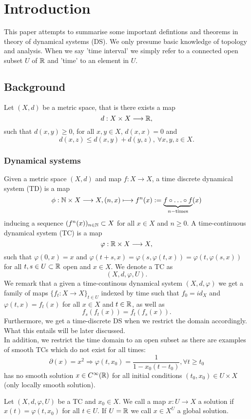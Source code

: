 \section{Introduction}
This paper attempts to summarise some important defintions and theorems in theory of dynamical systems (DS). We only presume basic knowledge of topology and analysis. When we say 'time interval' we simply refer to a connected open subset $U$ of $\mathbb{R}$ and 'time' to an element in $U$.
\subsection{Background}
Let $(X,d)$ be a metric space, that is there exists a map
$$d : X \times X \longrightarrow \mathbb{R},$$
such that $d(x,y) \geq 0$, for all $x, y \in X$, $d(x,x) = 0$ and 
$$d(x,z) \leq d(x,y) + d(y,z),\ \forall x, y, z \in X.$$
\subsubsection{Dynamical systems}
Given a metric space $(X,d)$ and map $f : X \longrightarrow X$, a time discrete dynamical system (TD) is a map
$$\phi : \mathbb{N} \times X \longrightarrow X, (n,x) \longmapsto f^n (x) := \underbrace{f \circ \ldots \circ f}_{n-\mathrm{times}}(x)$$
inducing a sequence $(f^n(x))_{n \in \mathbb{N}} \subset X$ for all $x \in X$ and $n \geq 0$. A time-continuous dynamical system (TC) is a map
$$\varphi : \mathbb{R} \times X \longrightarrow X,$$
such that $\varphi(0,x) = x$ and $\varphi(t + s,x) = \varphi(s,\varphi(t,x)) = \varphi(t,\varphi(s,x))$ for all $t, s \in U \subset \mathbb{R}$ open and $x \in X$. We denote a TC as
$$(X, d, \varphi, U).$$
We remark that a given a time-continous dynamical system $(X,d,\varphi)$ we get a family of maps $\{f_t : X \longrightarrow X\}_{t \in U}$ indexed by time such that $f_0 = id_X$ and $\varphi(t,x) = f_t(x)$ for all $x \in X$ and $t \in \mathbb{R}$, as well as
$$f_s(f_t(x)) = f_t(f_s(x)).$$
Furthermore, we get a time-discrete DS when we restrict the domain accordingly. What this entails will be later discussed.\\
\indent In addition, we restrict the time domain to an open subset as there are examples of smooth TCs which do not exist for all times:
$$\partial(x) = x^2 \Rightarrow \varphi(t,x_0) = \frac{1}{1 - x_0(t - t_0)}, \forall t \geq t_0$$
has no smooth solution $x \in C^\infty(\mathbb{R})$ for all initial conditions $(t_0,x_0) \in U \times X$ (only locally smooth solution).
\begin{defi}
Let $(X, d, \varphi, U)$ be a TC and $x_0 \in X$. We call a map $x : U \longrightarrow X$ a solution if $x(t) = \varphi(t,x_0)$ for all $t \in U$. If $U = \mathbb{R}$ we call $x \in X^U$ a global solution.
\end{defi}
